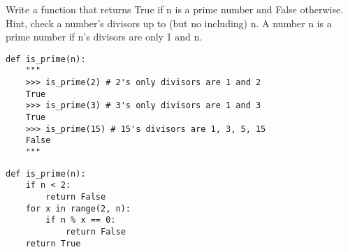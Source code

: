 \begin{blocksection}
\question Write a function that returns True if n is a prime number and False otherwise. Hint, check a number's divisors up to (but no including) n. A number n is a prime number if n's divisors are only 1 and n. 

\begin{lstlisting}
def is_prime(n):
    """
    >>> is_prime(2) # 2's only divisors are 1 and 2
    True
    >>> is_prime(3) # 3's only divisors are 1 and 3
    True
    >>> is_prime(15) # 15's divisors are 1, 3, 5, 15
    False
    """

\end{lstlisting}

\begin{solution}[1.5in]
\begin{lstlisting}
def is_prime(n):
    if n < 2:
        return False
    for x in range(2, n):
        if n % x == 0:
            return False
    return True
\end{lstlisting}
\end{solution}
\end{blocksection}
